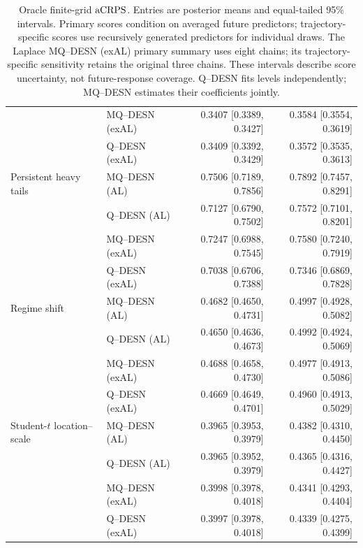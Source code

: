 \begin{table}[!htbp]
\begin{tabular}{@{}>{\raggedright\arraybackslash}p{}lrr@{}}
 & MQ--DESN (exAL) & 0.3407 [0.3389, 0.3427] & 0.3584 [0.3554, 0.3619] \\
 & Q--DESN (exAL) & 0.3409 [0.3392, 0.3429] & 0.3572 [0.3535, 0.3613] \\
\addlinespace[2pt]
Persistent heavy tails & MQ--DESN (AL) & 0.7506 [0.7189, 0.7856] & 0.7892 [0.7457, 0.8291] \\
 & Q--DESN (AL) & 0.7127 [0.6790, 0.7502] & 0.7572 [0.7101, 0.8201] \\
 & MQ--DESN (exAL) & 0.7247 [0.6988, 0.7545] & 0.7580 [0.7240, 0.7919] \\
 & Q--DESN (exAL) & 0.7038 [0.6706, 0.7388] & 0.7346 [0.6869, 0.7828] \\
\addlinespace[2pt]
Regime shift & MQ--DESN (AL) & 0.4682 [0.4650, 0.4731] & 0.4997 [0.4928, 0.5082] \\
 & Q--DESN (AL) & 0.4650 [0.4636, 0.4673] & 0.4992 [0.4924, 0.5069] \\
 & MQ--DESN (exAL) & 0.4688 [0.4658, 0.4730] & 0.4977 [0.4913, 0.5086] \\
 & Q--DESN (exAL) & 0.4669 [0.4649, 0.4701] & 0.4960 [0.4913, 0.5029] \\
\addlinespace[2pt]
Student-\(t\) location--scale & MQ--DESN (AL) & 0.3965 [0.3953, 0.3979] & 0.4382 [0.4310, 0.4450] \\
 & Q--DESN (AL) & 0.3965 [0.3952, 0.3979] & 0.4365 [0.4316, 0.4427] \\
 & MQ--DESN (exAL) & 0.3998 [0.3978, 0.4018] & 0.4341 [0.4293, 0.4404] \\
 & Q--DESN (exAL) & 0.3997 [0.3978, 0.4018] & 0.4339 [0.4275, 0.4399] \\
\bottomrule
\end{tabular}
\caption{Oracle finite-grid \(\operatorname{aCRPS}\). Entries are posterior means and equal-tailed 95\% intervals. Primary scores condition on averaged future predictors; trajectory-specific scores use recursively generated predictors for individual draws. The Laplace MQ--DESN (exAL) primary summary uses eight chains; its trajectory-specific sensitivity retains the original three chains. These intervals describe score uncertainty, not future-response coverage. Q--DESN fits levels independently; MQ--DESN estimates their coefficients jointly.}
\label{tab:joint-qdesn-pure-desn-v2-recursive-policy}
\label{tab:joint-qdesn-pure-desn-v2-score}
\end{table}
